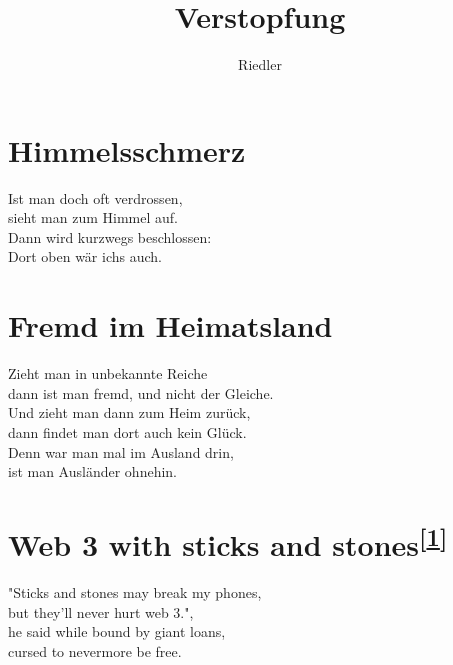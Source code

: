 \documentclass[11pt]{article}
\title{\textbf{Verstopfung}}
\author{Riedler}
\date{}
\begin{document}
\maketitle
\thispagestyle{empty}

\section*{Himmelsschmerz}

Ist man doch oft verdrossen,\\
sieht man zum Himmel auf.\\
Dann wird kurzwegs beschlossen:\\
Dort oben wär ichs auch.

\section*{Fremd im Heimatsland}

Zieht man in unbekannte Reiche\\
dann ist man fremd, und nicht der Gleiche.\\
Und zieht man dann zum Heim zurück,\\
dann findet man dort auch kein Glück.\\
Denn war man mal im Ausland drin,\\
ist man Ausländer ohnehin.

\section*{Web 3 with sticks and stones\textsuperscript{[\href{https://mas.to/@Riedler/109154135549306406}{1}]}}
"Sticks and stones may break my phones,\\
but they'll never hurt web 3.",\\
he said while bound by giant loans,\\
cursed to nevermore be free.
\end{document}
